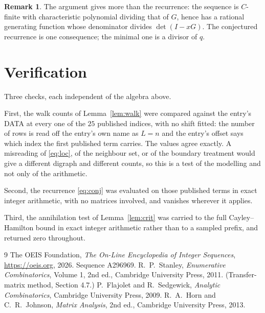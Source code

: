 \documentclass[11pt,a4paper]{article}
\theoremstyle{plain}
\theoremstyle{definition}
\newtheorem{remark}[theorem]{Remark}
\begin{document}
\begin{remark}
The argument gives more than the recurrence: the sequence is $C$-finite with characteristic
polynomial dividing that of $G$, hence has a rational generating function whose denominator
divides $\det(I-xG)$. The conjectured recurrence is one consequence; the minimal one is a
divisor of $q$.
\end{remark}

\section{Verification}

Three checks, each independent of the algebra above.

First, the walk counts of Lemma~\ref{lem:walk} were compared against the entry's DATA at
every one of the $25$ published indices, with no shift fitted: the number of rows is
read off the entry's own name as $L=n$ and the entry's offset says which index the first
published term carries. The values agree exactly. A misreading of \eqref{eq:loc}, of the
neighbour set, or of the boundary treatment would give a different digraph and different
counts, so this is a test of the modelling and not only of the arithmetic.

Second, the recurrence \eqref{eq:conj} was evaluated on those published terms in exact
integer arithmetic, with no matrices involved, and vanishes wherever it applies.

Third, the annihilation test of Lemma~\ref{lem:crit} was carried to the full
Cayley--Hamilton bound in exact integer arithmetic rather than to a sampled prefix, and
returned zero throughout.

\begin{thebibliography}{9}
 The OEIS Foundation, \emph{The On-Line Encyclopedia of Integer
Sequences}, \url{https://oeis.org}, 2026. Sequence A296969.
 R.~P.~Stanley, \emph{Enumerative Combinatorics}, Volume 1, 2nd ed.,
Cambridge University Press, 2011. (Transfer-matrix method, Section 4.7.)
 P.~Flajolet and R.~Sedgewick, \emph{Analytic Combinatorics}, Cambridge
University Press, 2009.
 R.~A.~Horn and C.~R.~Johnson, \emph{Matrix Analysis}, 2nd ed., Cambridge
University Press, 2013.
\end{thebibliography}
\end{document}
